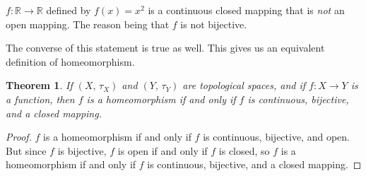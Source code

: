 \documentclass{article}
\theoremstyle{plain}
\newtheorem{theorem}{Theorem}[section]
\theoremstyle{normal}
\begin{document}
        $f:\mathbb{R}\rightarrow\mathbb{R}$ defined by $f(x)=x^{2}$ is a
        continuous closed mapping that is \textit{not} an open mapping. The
        reason being that $f$ is not bijective.
        \par\hfill\par
        The converse of this statement is true as well. This gives us an
        equivalent definition of homeomorphism.
        \begin{theorem}
            If $(X,\,\tau_{X})$ and $(Y,\,\tau_{Y})$ are topological spaces,
            and if $f:X\rightarrow{Y}$ is a function, then $f$ is a
            homeomorphism if and only if $f$ is continuous, bijective, and a
            closed mapping.
        \end{theorem}
        \begin{proof}
            $f$ is a homeomorphism if and only if $f$ is continuous, bijective,
            and open. But since $f$ is bijective, $f$ is open if and only if
            $f$ is closed, so $f$ is a homeomorphism if and only if $f$ is
            continuous, bijective, and a closed mapping. 
        \end{proof}
\end{document}

